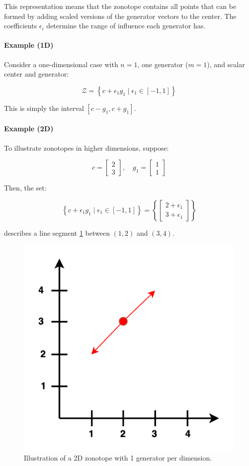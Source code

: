 \documentclass[oneside,11pt,dvipsnames]{book}
\numberwithin{equation}{section}
\theoremstyle{definition}
\theoremstyle{remark}
\begin{document}
This representation means that the zonotope contains all points that can be formed by adding scaled versions of the generator vectors to the center. The coefficients \(\epsilon_i\) determine the range of influence each generator has.

\paragraph{Example (1D)} Consider a one-dimensional case with \(n = 1\), one generator (\(m = 1\)), and scalar center and generator:

\[
\mathcal{Z} = \left\{c + \epsilon_1 g_1 \mid \epsilon_1 \in [-1, 1]\right\}
\]

This is simply the interval \([c - g_1, c + g_1]\).

\paragraph{Example (2D)} To illustrate zonotopes in higher dimensions, suppose:

\[
c = \begin{bmatrix}2 \\ 3\end{bmatrix}, \quad
g_1 = \begin{bmatrix}1 \\ 1\end{bmatrix}
\]

Then, the set:

\[
\left\{c + \epsilon_1 g_1 \mid \epsilon_1 \in [-1, 1]\right\}
= \left\{
\begin{bmatrix}2 + \epsilon_1 \\ 3 + \epsilon_1\end{bmatrix}
\right\}
\]

describes a line segment \ref{fig:2d1gzonotope-example} between \((1, 2)\) and \((3, 4)\).

\begin{figure}[h]
    \centering
    \includegraphics[width=0.5\linewidth]{figure/2d-zonotope.png}
    \caption{Illustration of a 2D zonotope with 1 generator per dimension.}
    \label{fig:2d1gzonotope-example}
\end{figure}
\end{document}
